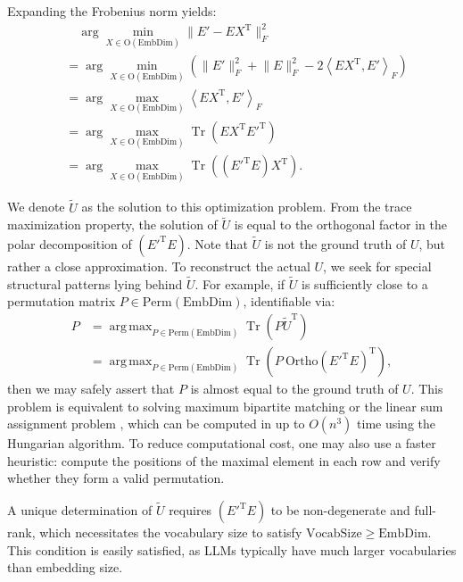 \documentclass{article} %
\DeclareMathOperator*{\argmax}{arg\,max}
\DeclareMathOperator{\Tr}{Tr}
\begin{document}
Expanding the Frobenius norm yields:
\[
\begin{aligned}
    &\quad\arg\min_{X \in \mathrm{O}(\mathrm{EmbDim})} \lVert E' - E X^{\text{T}} \rVert_F^2 \\
    &= \arg\min_{X \in \mathrm{O}(\mathrm{EmbDim})} \left( \lVert E' \rVert_F^2 + \lVert E \rVert_F^2 - 2 \left\langle E X^{\text{T}}, E' \right\rangle_F \right) \\
    &= \arg\max_{X \in \mathrm{O}(\mathrm{EmbDim})} \left\langle E X^{\text{T}}, E' \right\rangle_F \\
    &= \arg\max_{X \in \mathrm{O}(\mathrm{EmbDim})} \Tr \left(E X^{\text{T}} E'^{\text{T}} \right) \\
    &= \arg\max_{X \in \mathrm{O}(\mathrm{EmbDim})} \Tr \left((E'^{\text{T}} E) X^{\text{T}} \right).
\end{aligned}
\]

We denote $\tilde{U}$ as the solution to this optimization problem. 
From the trace maximization property, the solution of $\tilde{U}$ is equal to the orthogonal factor in the polar decomposition of $(E'^{\text{T}} E)$.  
Note that $\tilde{U}$ is not the ground truth of $U$, but rather a close approximation. To reconstruct the actual $U$, we seek for special structural patterns lying behind $\tilde{U}$.
For example, if $\tilde{U}$ is sufficiently close to a permutation matrix $P \in \mathrm{Perm}(\mathrm{EmbDim})$, identifiable via:
\begin{equation}
\begin{aligned}
    \label{eqmainformula}
    P &= \argmax_{P \in \mathrm{Perm}(\mathrm{EmbDim})} \Tr(P \tilde{U}^{\text{T}}) \\
    &= \argmax_{P \in \mathrm{Perm}(\mathrm{EmbDim})} \Tr\left(P \ \mathrm{Ortho} (E'^{\text{T}} E)^{\text{T}}\right),
\end{aligned}
\end{equation}
then we may safely assert that $P$ is almost equal to the ground truth of $U$.
This problem is equivalent to solving maximum bipartite matching or the linear sum assignment problem \citep{scipy_linear_sum_assignment},  
which can be computed in up to $O(n^3)$ time using the Hungarian algorithm. 
To reduce computational cost, one may also use a faster heuristic: compute the positions of the maximal element in each row and verify whether they form a valid permutation.

A unique determination of $\tilde{U}$ requires $(E'^{\text{T}} E)$ to be non-degenerate and full-rank, which necessitates the vocabulary size to satisfy $\mathrm{VocabSize} \geq \mathrm{EmbDim}$.  
This condition is easily satisfied, as LLMs typically have much larger vocabularies than embedding size.
\end{document}
